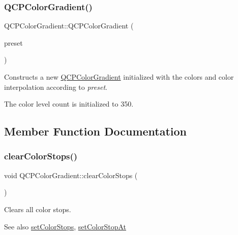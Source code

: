 \subsubsection{\texorpdfstring{Q\+C\+P\+Color\+Gradient()}{QCPColorGradient()}\hspace{0.1cm}{\footnotesize\ttfamily [2/2]}}
{\footnotesize\ttfamily Q\+C\+P\+Color\+Gradient\+::\+Q\+C\+P\+Color\+Gradient (\begin{DoxyParamCaption}\item[{\hyperlink{class_q_c_p_color_gradient_aed6569828fee337023670272910c9072}{Gradient\+Preset}}]{preset }\end{DoxyParamCaption})}

Constructs a new \hyperlink{class_q_c_p_color_gradient}{Q\+C\+P\+Color\+Gradient} initialized with the colors and color interpolation according to {\itshape preset}.

The color level count is initialized to 350. 

\subsection{Member Function Documentation}
\mbox{\label{class_q_c_p_color_gradient_a939213e85f0d1279519d555c5fcfb6ad}} 
\subsubsection{\texorpdfstring{clear\+Color\+Stops()}{clearColorStops()}}
{\footnotesize\ttfamily void Q\+C\+P\+Color\+Gradient\+::clear\+Color\+Stops (\begin{DoxyParamCaption}{ }\end{DoxyParamCaption})}

Clears all color stops.

\begin{DoxySeeAlso}{See also}
\hyperlink{class_q_c_p_color_gradient_a724e828aa6f0ba5011a9392477c35d3a}{set\+Color\+Stops}, \hyperlink{class_q_c_p_color_gradient_a3b48be5e78079db1bb2a1188a4c3390e}{set\+Color\+Stop\+At} 
\end{DoxySeeAlso}
\mbox{\label{class_q_c_p_color_gradient_aaf423ceb943e177b0ed2c48c811d83dc}} 
